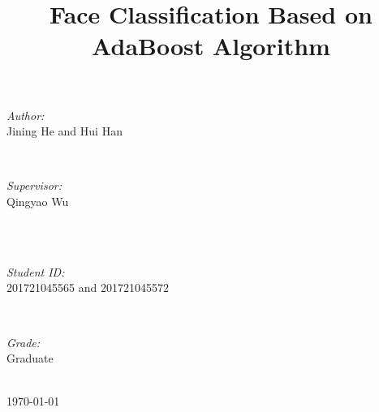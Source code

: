 \documentclass[journal, a4paper]{IEEEtran}
\begin{document}
\begin{titlepage}
\begin{minipage}{0.4\textwidth}
\begin{flushleft} \large
\emph{Author:}\\
Jining He and Hui Han %
\end{flushleft}
\end{minipage}
~
\begin{minipage}{0.4\textwidth}
\begin{flushright} \large
\emph{Supervisor:} \\
Qingyao Wu %
\end{flushright}
\end{minipage}\\[2cm]
~
\begin{minipage}{0.4\textwidth}
\begin{flushleft} \large
\emph{Student ID:}\\
201721045565 and 201721045572
\end{flushleft}
\end{minipage}
~
\begin{minipage}{0.4\textwidth}
\begin{flushright} \large
\emph{Grade:} \\
Graduate
\end{flushright}
\end{minipage}\\[2cm]



{\large \today}\\[2cm] %

 

\vfill %

\end{titlepage}

	\title{Face Classification Based on AdaBoost Algorithm}
	\maketitle
\end{document}
